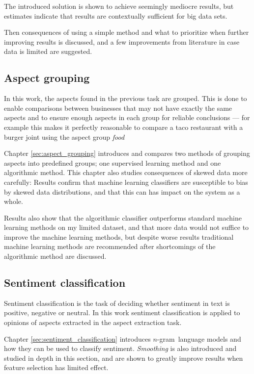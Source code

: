 \documentclass[a4paper,11pt]{kth-mag}
\newcommand{\ngram}{$n$-gram}
\begin{document}
The introduced solution is shown to achieve seemingly mediocre results, but estimates indicate
that results are contextually sufficient for big data sets.

Then consequences of using a simple method and what to prioritize when further improving results is discussed,
and a few improvements from literature in case data is limited are suggested.

\subsection{Aspect grouping}
In this work, the aspects found in the previous task are grouped. This is done to enable comparisons between
businesses that may not have exactly the same aspects and to ensure enough aspects in each group for reliable conclusions --- for example this makes it perfectly reasonable to compare a taco restaurant with a burger joint using the aspect group \emph{food}

Chapter \ref{sec:aspect_grouping} introduces and compares two methods of grouping aspects into predefined groups;
one supervised learning method and one algorithmic method.
This chapter also studies consequences of skewed data more carefully: Results confirm that machine learning classifiers are susceptible to bias by skewed data distributions, and that this can has impact on the system as a whole.

Results also show that the algorithmic classifier outperforms standard machine learning methods on my
limited dataset, and that more data would not suffice to improve the machine learning methods,
but despite worse results traditional machine learning methods are recommended after shortcomings of the
algorithmic method are discussed.


\subsection{Sentiment classification}
Sentiment classification is the task of deciding whether sentiment in text is positive, negative or neutral.
In this work sentiment classification is applied to opinions of aspects extracted in the aspect extraction task.

Chapter \ref{sec:sentiment_classification} introduces \ngram~language models and how they can be used
to classify sentiment. \emph{Smoothing} is also introduced and studied in depth in this section, and are shown
to greatly improve results when feature selection has limited effect.
\end{document}
